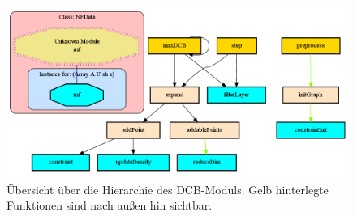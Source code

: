 \documentclass[a4paper]{scrartcl}
\begin{document}
\begin{figure}[h!]
 \centering
 \includegraphics[scale=0.5,keepaspectratio=true]{./img/DCB-Module.png}
 \caption{Übersicht über die Hierarchie des DCB-Moduls. Gelb hinterlegte Funktionen sind nach außen hin sichtbar.}
 \label{fig:DCB-Overview}
\end{figure}
\end{document}
